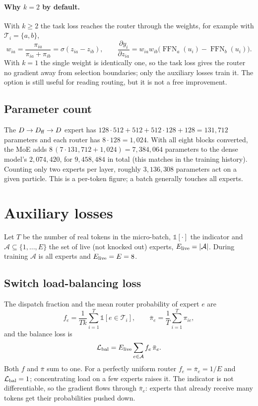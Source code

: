 \documentclass[11pt,a4paper]{article}
\newcommand{\code}[1]{\texttt{\detokenize{#1}}}
\newcommand{\FFN}{\operatorname{FFN}}
\begin{document}
\paragraph{Why $k=2$ by default.}
With $k\ge2$ the task loss reaches the router through the weights, for example with
$\mathcal T_i=\{a,b\}$,
\begin{equation}
 w_{ia}=\frac{\pi_{ia}}{\pi_{ia}+\pi_{ib}}=\sigma(z_{ia}-z_{ib}),\qquad
 \frac{\partial y_i}{\partial z_{ia}}=w_{ia}w_{ib}\big(\FFN_a(u_i)-\FFN_b(u_i)\big).
\end{equation}
With $k=1$ the single weight is identically one, so the task loss gives the router no gradient
away from selection boundaries; only the auxiliary losses train it. The \code{--top_k 1}
option is still useful for reading routing, but it is not a free improvement.

\subsection{Parameter count}
The $D\to D_{\rm ff}\to D$ expert has $128\cdot512+512+512\cdot128+128=131{,}712$ parameters
and each router has $8\cdot128=1{,}024$. With all eight blocks converted, the MoE adds
$8\,(7\cdot131{,}712+1{,}024)=7{,}384{,}064$ parameters to the dense model's $2{,}074{,}420$,
for $9{,}458{,}484$ in total (this matches \code{n_params} in the training history).
Counting only two experts per layer, roughly $3{,}136{,}308$ parameters act on a given
particle. This is a per-token figure; a batch generally touches all experts.

\section{Auxiliary losses}

Let $T$ be the number of real tokens in the micro-batch, $\mathbb 1[\cdot]$ the indicator and
$\mathcal A\subseteq\{1,\dots,E\}$ the set of live (not knocked out) experts, $E_{\rm live}=|\mathcal A|$.
During training $\mathcal A$ is all experts and $E_{\rm live}=E=8$.

\subsection{Switch load-balancing loss}
The dispatch fraction and the mean router probability of expert $e$ are
\begin{equation}
 f_e=\frac{1}{Tk}\sum_{i=1}^{T}\mathbb 1[e\in\mathcal T_i],\qquad
 \bar\pi_e=\frac1T\sum_{i=1}^{T}\pi_{ie},
\end{equation}
and the balance loss is
\begin{equation}
 \mathcal L_{\rm bal}=E_{\rm live}\sum_{e\in\mathcal A}f_e\,\bar\pi_e .
\end{equation}
Both $f$ and $\bar\pi$ sum to one. For a perfectly uniform router $f_e=\bar\pi_e=1/E$ and
$\mathcal L_{\rm bal}=1$; concentrating load on a few experts raises it. The indicator is not
differentiable, so the gradient flows through $\bar\pi_e$: experts that already receive many
tokens get their probabilities pushed down.
\end{document}
